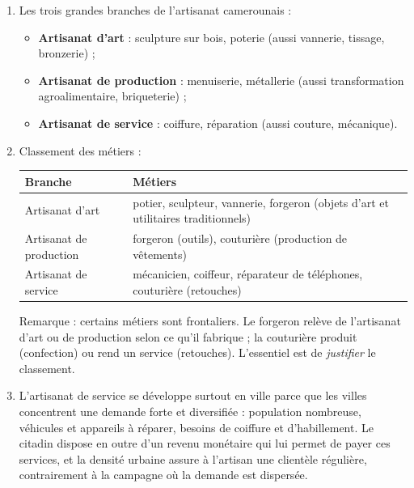\documentclass[11pt]{article}
\newcommand{\cle}[1]{{\popxbold\color{popdark}#1}}
\begin{document}
\begin{corrige}
\begin{enumerate}
\item Les trois grandes branches de l'artisanat camerounais :
\begin{itemize}
\item \textbf{Artisanat d'art} : sculpture sur bois, poterie (aussi vannerie, tissage, bronzerie) ;
\item \textbf{Artisanat de production} : menuiserie, métallerie (aussi transformation agroalimentaire, briqueterie) ;
\item \textbf{Artisanat de service} : coiffure, réparation (aussi couture, mécanique).
\end{itemize}
\item Classement des métiers :
\begin{center}
\begin{tabularx}{\linewidth}{|l|X|}\hline
\rowcolor{popblueL} Branche & Métiers \\ \hline
Artisanat d'art & potier, sculpteur, vannerie, forgeron (objets d'art et utilitaires traditionnels) \\ \hline
Artisanat de production & forgeron (outils), couturière (production de vêtements) \\ \hline
Artisanat de service & mécanicien, coiffeur, réparateur de téléphones, couturière (retouches) \\ \hline
\end{tabularx}
\end{center}
Remarque : certains métiers sont frontaliers. Le forgeron relève de l'artisanat d'art ou de production selon ce qu'il fabrique ; la couturière produit (confection) ou rend un service (retouches). L'essentiel est de \emph{justifier} le classement.
\item L'artisanat de service se développe surtout en ville parce que les villes concentrent une \cle{demande} forte et diversifiée : population nombreuse, véhicules et appareils à réparer, besoins de coiffure et d'habillement. Le citadin dispose en outre d'un revenu monétaire qui lui permet de payer ces services, et la densité urbaine assure à l'artisan une clientèle régulière, contrairement à la campagne où la demande est dispersée.
\end{enumerate}
\end{corrige}
\end{document}
